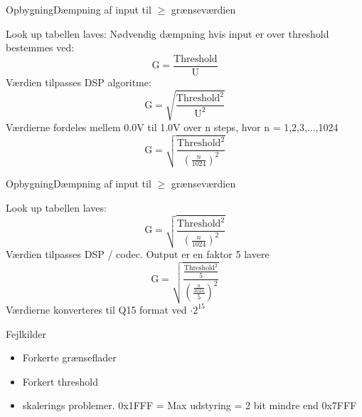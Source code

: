 \begin{frame}{Opbygning}{Dæmpning af input til $\geq$ grænseværdien}
	\begin{block}{Look up tabellen laves:}
	Nødvendig dæmpning hvis input er over threshold bestemmes ved:
	$$ \text{G} = \frac{\text{Threshold}}{\text{U}}$$
	Værdien tilpasses DSP algoritme:
	\alert{$$ \text{G} = \sqrt{\frac{\text{Threshold}^2}{\text{U}^2}}$$}
	Værdierne fordeles mellem 0.0V til 1.0V over n steps, hvor n = 1,2,3,...,1024
	$$ \text{G} = \sqrt{\frac{\text{Threshold}^2}{(\frac{n}{1024})^2}}$$
	\end{block}	
\end{frame}

\begin{frame}{Opbygning}{Dæmpning af input til $\geq$ grænseværdien}
	\begin{block}{Look up tabellen laves:}
	$$ \text{G} = \sqrt{\frac{\text{Threshold}^2}{(\frac{n}{1024})^2}}$$
		Værdien tilpasses DSP / codec. Output er en faktor 5 lavere
	\alert{$$ \text{G} = \sqrt{\frac{\frac{\text{Threshold}^2}{5}}{(\frac{\frac{n}{1024}}{5})^2}}$$}
		Værdierne konverteres til Q15 format ved $\cdot 2^{15}$
	\end{block}	
\begin{block}{\alert{Fejlkilder}}
\vspace*{-3mm}
	\begin{itemize}
		\item Forkerte grænseflader
		\item Forkert threshold
		\item skalerings problemer. 0x1FFF = Max udstyring = 2 bit mindre end 0x7FFF
	\end{itemize}	
\end{block}
\end{frame}




